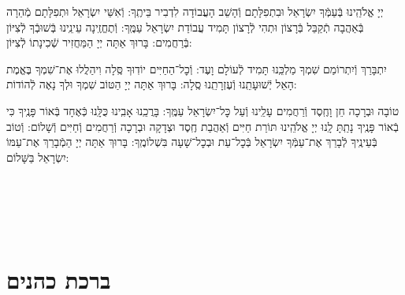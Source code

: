 \documentclass[twoside, openany, parskip=half, 11pt]{book}
\begin{document}
\begin{sometimes}

 יְיָ אֱלֹהֵֽינוּ בְּֿעַמְּֿךָ יִשְׂרָאֵל וּבִתְפִלָּתָם וְֿהָשֵׁב הָעֲבוֹדָה לִדְבִיר בֵּיתֶֽךָ: וְֿאִשֵּׁי יִשְׂרָאֵל וּתְפִלָּתָם מְֿהֵרָה בְּֿאַהֲבָה תְֿקַבֵּל בְּֿרָצוֹן וּתְהִי לְֿרָצוֹן תָּמִיד עֲבוֹדַת יִשְׂרָאֵל עַמֶּֽךָ: וְֿתֶחֱזֶֽינָה עֵינֵֽינוּ בְּֿשׁוּבְֿךָ לְֿצִיּוֹן בְּֿרַחֲמִים: בָּרוּךְ אַתָּה יְיָ הַמַּחֲזִיר שְֿׁכִינָתוֹ לְֿצִיּוֹן:

\modim


\clearpage

\vspace{-\baselineskip}
 יִתְבָּרַךְ וְֿיִתְרוֹמַם שִׁמְךָ מַלְכֵּֽנוּ תָּמִיד לְֿעוֹלָם וָעֶד: וְֿכׇל־הַחַיִּים יוֹדֽוּךָ סֶּֽלָה וִיהַלֲלוּ אֶת־שִׁמְךָ בֶּאֱמֶת הָאֵל יְֿשׁוּעָתֵֽנוּ וְֿעֶזְרָתֵֽנוּ סֶֽלָה: בָּרוּךְ אַתָּה יְיָ הַטּוֹב שִׁמְךָ וּלְךָ נָאֶה לְֿהוֹדוֹת:



 טוֹבָה וּבְרָכָה חֵן וָחֶֽסֶד וְֿרַחֲמִים עָלֵֽינוּ וְֿעַל כׇּל־יִשְׂרָאֵל עַמֶּֽךָ: בָּרֲכֵֽנוּ אָבִֽינוּ כֻּלָּֽנוּ כְּֿאֶחָד בְּֿאוֹר פָּנֶֽיךָ כִּי בְֿאוֹר פָּנֶֽיךָ נָתַֽתָּ לָֽנוּ יְיָ אֱלֹהֵֽינוּ תּוֹרַת חַיִּים וְֿאַהֲבַת חֶֽסֶד וּצְדָקָה וּבְרָכָה וְֿרַחֲמִים וְֿחַיִּים וְֿשָׁלוֹם: וְֿטוֹב בְּֿעֵינֶֽיךָ לְֿבָרֵךְ אֶת־עַמְּֿךָ יִשְׂרָאֵל בְּֿכׇל־עֵת וּבְכׇל־שָׁעָה בִּשְׁלוֹמֶֽךָ: בָּרוּךְ אַתָּה יְיָ הַמְֿבָרֵךְ אֶת־עַמּוֹ יִשְׂרָאֵל בַּשָּׁלוֹם:

\tachanunim

\vfill


 \\

\sepline

 \\
 \\


\sepline

\clearpage

\vspace{-1\baselineskip}
\section[ברכת כהנים]{ ברכת כהנים ‎}
\label{birkaskohanim}


\end{sometimes}
\end{document}
